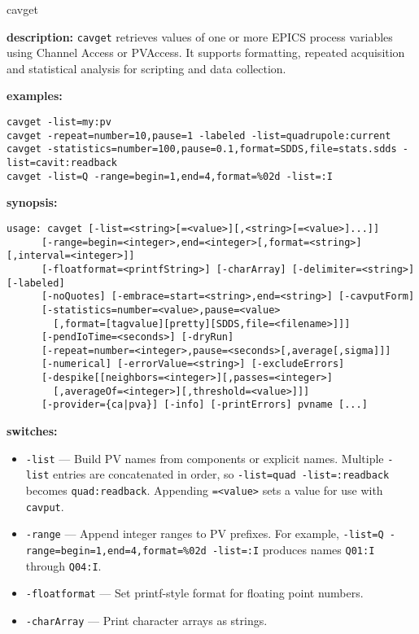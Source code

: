 %
%
\begin{sddsprog}{cavget}
\item \textbf{description:}
\verb+cavget+ retrieves values of one or more EPICS process variables using Channel Access or PVAccess.
It supports formatting, repeated acquisition and statistical analysis for scripting and data collection.
\item \textbf{examples:}
\begin{verbatim}
cavget -list=my:pv
cavget -repeat=number=10,pause=1 -labeled -list=quadrupole:current
cavget -statistics=number=100,pause=0.1,format=SDDS,file=stats.sdds -list=cavit:readback
cavget -list=Q -range=begin=1,end=4,format=%02d -list=:I
\end{verbatim}
\item \textbf{synopsis:}
\begin{verbatim}
usage: cavget [-list=<string>[=<value>][,<string>[=<value>]...]]
      [-range=begin=<integer>,end=<integer>[,format=<string>][,interval=<integer>]]
      [-floatformat=<printfString>] [-charArray] [-delimiter=<string>] [-labeled]
      [-noQuotes] [-embrace=start=<string>,end=<string>] [-cavputForm]
      [-statistics=number=<value>,pause=<value>
        [,format=[tagvalue][pretty][SDDS,file=<filename>]]]
      [-pendIoTime=<seconds>] [-dryRun]
      [-repeat=number=<integer>,pause=<seconds>[,average[,sigma]]]
      [-numerical] [-errorValue=<string>] [-excludeErrors]
      [-despike[[neighbors=<integer>][,passes=<integer>]
        [,averageOf=<integer>][,threshold=<value>]]]
      [-provider={ca|pva}] [-info] [-printErrors] pvname [...]
\end{verbatim}
\item \textbf{switches:}
\begin{itemize}
  \item {\tt -list} --- Build PV names from components or explicit names. Multiple
    \verb+-list+ entries are concatenated in order, so \verb+-list=quad -list=:readback+
    becomes \verb+quad:readback+. Appending \verb+=<value>+ sets a value for use with
    \verb+cavput+.
  \item {\tt -range} --- Append integer ranges to PV prefixes. \newline
    For example, \verb+-list=Q -range=begin=1,end=4,format=%02d -list=:I+ \newline
    produces names \verb+Q01:I+ through \verb+Q04:I+.
  \item {\tt -floatformat} --- Set printf-style format for floating point numbers.
  \item {\tt -charArray} --- Print character arrays as strings.

\end{itemize}
\end{sddsprog}
